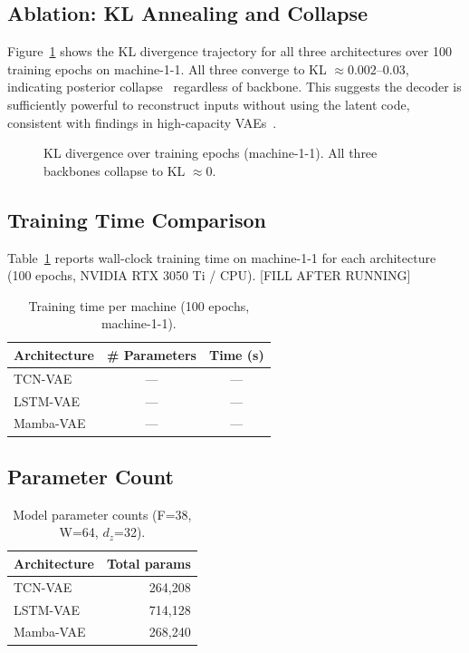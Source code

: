 \documentclass[10pt,twocolumn]{article}
\begin{document}
\subsection{Ablation: KL Annealing and Collapse}

Figure~\ref{fig:kl_curves} shows the KL divergence trajectory for all three
architectures over 100 training epochs on machine-1-1. All three converge to
KL $\approx 0.002$--$0.03$, indicating posterior collapse~\cite{bowman2016generating}
regardless of backbone. This suggests the decoder is sufficiently powerful to
reconstruct inputs without using the latent code, consistent with findings in
high-capacity VAEs~\cite{van2017neural}.

\begin{figure}[h]
  \centering
  \caption{KL divergence over training epochs (machine-1-1). All three backbones
    collapse to KL $\approx 0$.}
  \label{fig:kl_curves}
\end{figure}

\subsection{Training Time Comparison}

Table~\ref{tab:train_time} reports wall-clock training time on machine-1-1 for
each architecture (100 epochs, NVIDIA RTX 3050 Ti / CPU).
[FILL AFTER RUNNING]

\begin{table}[h]
\centering
\caption{Training time per machine (100 epochs, machine-1-1).}
\label{tab:train_time}
\begin{tabular}{lcc}
\toprule
Architecture & \# Parameters & Time (s) \\
\midrule
TCN-VAE   & --- & --- \\
LSTM-VAE  & --- & --- \\
Mamba-VAE & --- & --- \\
\bottomrule
\end{tabular}
\end{table}

\subsection{Parameter Count}

\begin{table}[h]
\centering
\caption{Model parameter counts (F=38, W=64, $d_z$=32).}
\label{tab:params}
\begin{tabular}{lr}
\toprule
Architecture & Total params \\
\midrule
TCN-VAE   & 264,208 \\
LSTM-VAE  & 714,128 \\
Mamba-VAE & 268,240 \\
\bottomrule
\end{tabular}
\end{table}
\end{document}
